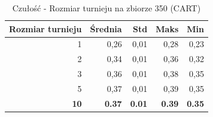 \begin{table}[htbp]
\centering
\small
\setlength{\tabcolsep}{6pt}
\renewcommand{\arraystretch}{1.2}
\caption{Czułość - Rozmiar turnieju na zbiorze 350 (CART)}
\label{tab:CART_tournament_size_350_recall}
\begin{tabular}{r|r|r|r|r}
\toprule
Rozmiar turnieju & Średnia & Std & Maks & Min \\
\hline
1 & 0,26 & 0,01 & 0,28 & 0,23 \\
2 & 0,34 & 0,01 & 0,36 & 0,32 \\
3 & 0,36 & 0,01 & 0,38 & 0,35 \\
5 & 0,37 & 0,01 & 0,39 & 0,35 \\
\textbf{10} & \textbf{0.37} & \textbf{0.01} & \textbf{0.39} & \textbf{0.35} \\
\bottomrule
\end{tabular}
\end{table}